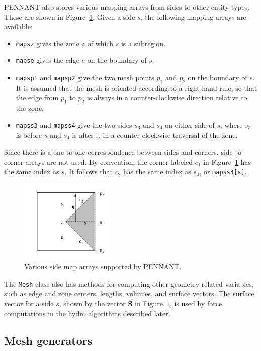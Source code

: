 \documentclass[11pt,letterpaper]{article}
\begin{document}
PENNANT also stores various mapping arrays from sides to other entity
types.  These are shown in Figure~\ref{fig:side}.
Given a side $s$, the following mapping arrays are available:
\begin{itemize} \itemsep1pt \parskip0pt
\item {\tt mapsz} gives the zone $z$ of which $s$ is a subregion.
\item {\tt mapse} gives the edge $e$ on the boundary of $s$.
\item {\tt mapsp1} and {\tt mapsp2} give the two mesh points $p_1$ and
$p_2$ on the boundary of $s$.  It is assumed that the mesh is oriented
according to a right-hand rule, so that the edge from $p_1$ to $p_2$
is always in a counter-clockwise direction relative to the zone.
\item {\tt mapss3} and {\tt mapss4} give the two sides $s_3$ and
$s_4$ on either side of $s$, where $s_3$ is before $s$ and $s_4$ is
after it in a counter-clockwise traversal of the zone.
\end{itemize}
Since there is a one-to-one correspondence between sides and corners,
side-to-corner arrays are not used.  By convention, the corner labeled
$c_1$ in Figure~\ref{fig:side} has the same index as $s$.  It follows
that $c_2$ has the same index as $s_4$, or {\tt mapss4[s]}.

\begin{figure}
    \centering
    \includegraphics[width=0.40\textwidth]{side-maps.png}
    \caption{Various side map arrays supported by PENNANT.}
    \label{fig:side}
\end{figure}

The {\tt Mesh} class also has methods for computing other
geometry-related variables, such as edge and zone centers, lengths,
volumes, and surface vectors.  The surface vector for a side $s$, shown
by the vector {\bf S} in Figure~\ref{fig:side}, is used by force
computations in the hydro algorithms described later.

\subsection{Mesh generators}
\end{document}
